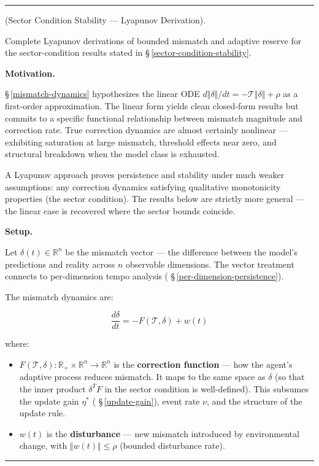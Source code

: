 \documentclass[11pt,oneside]{article}
\newcounter{claim}[section]
\renewcommand{\theclaim}{\thesection.\arabic{claim}}
\newenvironment{segment}[2]{%
  \refstepcounter{claim}%
  \bigskip\noindent\hrule\smallskip
  \noindent{\bfseries #1~\theclaim}\enskip(#2).\par\smallskip
  \noindent\ignorespaces
}{%
  \par\smallskip\noindent\hrule\bigskip
}
\newenvironment{derivation}[1][]{\begin{segment}{Derivation}{#1}}{\end{segment}}
\begin{document}
\begin{derivation}[Sector Condition Stability — Lyapunov Derivation]
\label{sector-condition-derivation}
Complete Lyapunov derivations of bounded mismatch and adaptive reserve for the sector-condition results stated in \S\,\ref{sector-condition-stability}.



\medskip\noindent\textbf{Motivation.}


\S\,\ref{mismatch-dynamics} hypothesizes the linear ODE $d\Vert\delta\Vert/dt = -\mathcal{T}\Vert\delta\Vert + \rho$ as a first-order approximation. The linear form yields clean closed-form results but commits to a specific functional relationship between mismatch magnitude and correction rate. True correction dynamics are almost certainly nonlinear — exhibiting saturation at large mismatch, threshold effects near zero, and structural breakdown when the model class is exhausted.

A Lyapunov approach proves persistence and stability under much weaker assumptions: any correction dynamics satisfying qualitative monotonicity properties (the sector condition). The results below are strictly more general — the linear case is recovered where the sector bounds coincide.


\medskip\noindent\textbf{Setup.}


Let $\delta(t) \in \mathbb{R}^n$ be the mismatch vector — the difference between the model's predictions and reality across $n$ observable dimensions. The vector treatment connects to per-dimension tempo analysis ( \S\,\ref{per-dimension-persistence}).

The mismatch dynamics are:


$$\frac{d\delta}{dt} = -F(\mathcal{T}, \delta) + w(t)$$

where:

\begin{itemize}
  \item $F(\mathcal{T}, \delta): \mathbb R_+ \times \mathbb{R}^n \to \mathbb{R}^n$ is the \textbf{correction function} — how the agent's adaptive process reduces mismatch. It maps to the same space as $\delta$ (so that the inner product $\delta^T F$ in the sector condition is well-defined). This subsumes the update gain $\eta^*$ ( \S\,\ref{update-gain}), event rate $\nu$, and the structure of the update rule.
  \item $w(t)$ is the \textbf{disturbance} — new mismatch introduced by environmental change, with $\Vert w(t)\Vert \leq \rho$ (bounded disturbance rate).
\end{itemize}



\end{derivation}
\end{document}
